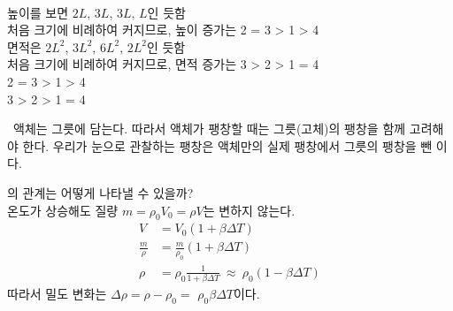 \begin{solbox}
\bnset
{} \\
\bn 높이를 보면 $2L$, $3L$, $3L$, $L$인 듯함 \\
\bns 처음 크기에 비례하여 커지므로, 높이 증가는 2 = 3 > 1 > 4 \\
\bn 면적은 $2L^2$, $3L^2$, $6L^2$, $2L^2$인 듯함 \\
\bns 처음 크기에 비례하여 커지므로, 면적 증가는 3 > 2 > 1 = 4 \\
 2 = 3 > 1 > 4 \\
 3 > 2 > 1 = 4
\end{solbox}

\ 액체는 그릇에 담는다. 따라서 액체가 팽창할 때는 그릇(고체)의 팽창을 함께 고려해야 한다.
우리가 눈으로 관찰하는 팽창은 액체만의 실제 팽창에서 그릇의 팽창을 뺀 이다.

\begin{sssbox}
의 관계는 어떻게 나타낼 수 있을까? \\
온도가 상승해도 질량 $m = \rho_0 V_0 = \rho V $는 변하지 않는다.
\vspace{-8pt}%
\begin{align*}
    V &= V_0 (1 + \beta \Delta T) \\
    \frac{m}{\rho} &= \frac{m}{\rho_0} (1 + \beta \Delta T) \\
    \rho &= \rho_0 \frac{1}{1 + \beta \Delta T} ~ \approx ~ \rho_0(1 - \beta \Delta T)
\end{align*}
%
따라서 밀도 변화는 $\Delta \rho = \rho - \rho_0 =$ \seolight{$-$} $\rho_0 \beta \Delta T$이다.
\end{sssbox}
\clearpage



